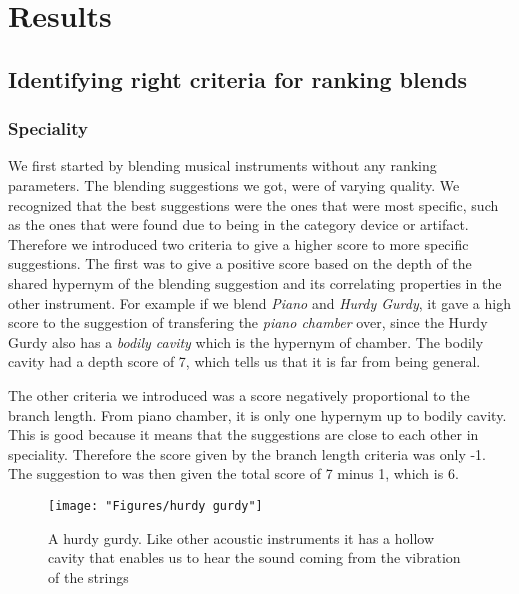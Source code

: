
\chapter{Results} %

\label{Chapter6} %


\section{Identifying right criteria for ranking blends}

\subsection{Speciality}
We first started by blending musical instruments without any ranking parameters. The blending suggestions we got, were of varying quality. We recognized that the best suggestions were the ones that were most specific, such as the ones that were found due to being in the category device or artifact. Therefore we introduced two criteria to give a higher score to more specific suggestions. The first was to give a positive score based on the depth of the shared hypernym of the blending suggestion and its correlating properties in the other instrument. For example if we blend \emph{Piano} and \emph{Hurdy Gurdy}, it gave a high score to the suggestion of transfering the \emph{piano chamber} over, since the Hurdy Gurdy also has a \emph{bodily cavity} which is the hypernym of chamber. The bodily cavity had a depth score of 7, which tells us that it is far from being general.

The other criteria we introduced was a score negatively proportional to the branch length. From piano chamber, it is only one hypernym up to bodily cavity. This is good because it means that the suggestions are close to each other in speciality. Therefore the score given by the branch length criteria was only -1. The suggestion to was then given the total score of 7 minus 1, which is 6.

\begin{figure}
\centering
\texttt{[image: "Figures/hurdy gurdy"]}
\caption{A hurdy gurdy. Like other acoustic instruments it has a hollow cavity that enables us to hear the sound coming from the vibration of the strings}
\label{fig:hurdy-gurdy}
\end{figure}

